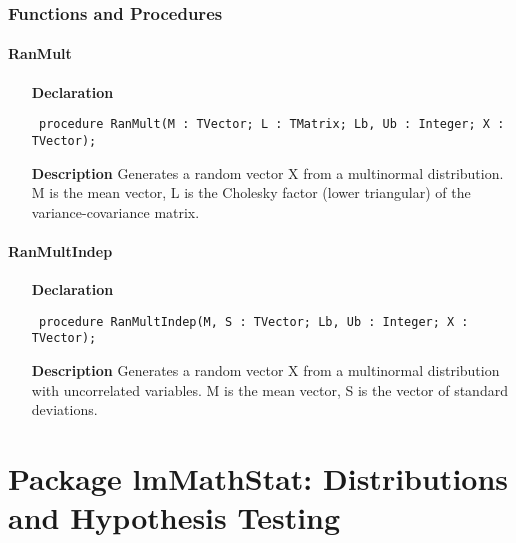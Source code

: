 \documentclass[12pt,a4paper,oneside]{report}
\newcommand{\declarationitem}[1]{\textbf{#1}}
\newcommand{\descriptiontitle}[1]{\textbf{#1}}
\newcommand{\code}[1]{\texttt{#1}}
\begin{document}
\subsection{Functions and Procedures}
\subsubsection{RanMult}
\label{uranmult-RanMult}
\begin{itemize}\item[\declarationitem{Declaration}\hfill]
	\begin{flushleft}
		\code{
			procedure RanMult(M : TVector; L : TMatrix; Lb, Ub : Integer; X : TVector);}
		
	\end{flushleft}
	
	\par
	\item[\descriptiontitle{Description}]
	Generates a random vector X from a multinormal distribution. M is the mean vector, L is the Cholesky factor (lower triangular) of the variance{-}covariance matrix.
	
\end{itemize}
\subsubsection{RanMultIndep}
\label{uranmult-RanMultIndep}
\begin{itemize}\item[\declarationitem{Declaration}\hfill]
	\begin{flushleft}
		\code{
			procedure RanMultIndep(M, S : TVector; Lb, Ub : Integer; X : TVector);}
		
	\end{flushleft}
	
	\par
	\item[\descriptiontitle{Description}]
	Generates a random vector X from a multinormal distribution with uncorrelated variables. M is the mean vector, S is the vector of standard deviations.
	
\end{itemize}


\chapter[Package lmMathStat]{Package lmMathStat: Distributions and Hypothesis Testing}\label{package-lmMathStat}
\end{document}
